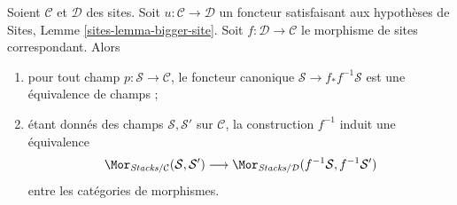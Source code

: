 \begin{lemma}
\label{lemma-bigger-site}
Soient $\mathcal{C}$ et $\mathcal{D}$ des sites.
Soit $u : \mathcal{C} \to \mathcal{D}$ un foncteur satisfaisant aux
hypothèses de
Sites, Lemme \ref{sites-lemma-bigger-site}.
Soit $f : \mathcal{D} \to \mathcal{C}$ le morphisme de sites
correspondant. Alors
\begin{enumerate}
\item pour tout champ $p : \mathcal{S} \to \mathcal{C}$, le
foncteur canonique $\mathcal{S} \to f_*f^{-1}\mathcal{S}$ est
une équivalence de champs ;
\item étant donnés des champs $\mathcal{S}, \mathcal{S}'$ sur $\mathcal{C}$,
la construction $f^{-1}$
induit une équivalence
$$
\Mor_{\textit{Stacks}/\mathcal{C}}(\mathcal{S}, \mathcal{S}')
\longrightarrow
\Mor_{\textit{Stacks}/\mathcal{D}}(f^{-1}\mathcal{S}, f^{-1}\mathcal{S}')
$$
entre les catégories de morphismes.
\end{enumerate}
\end{lemma}

